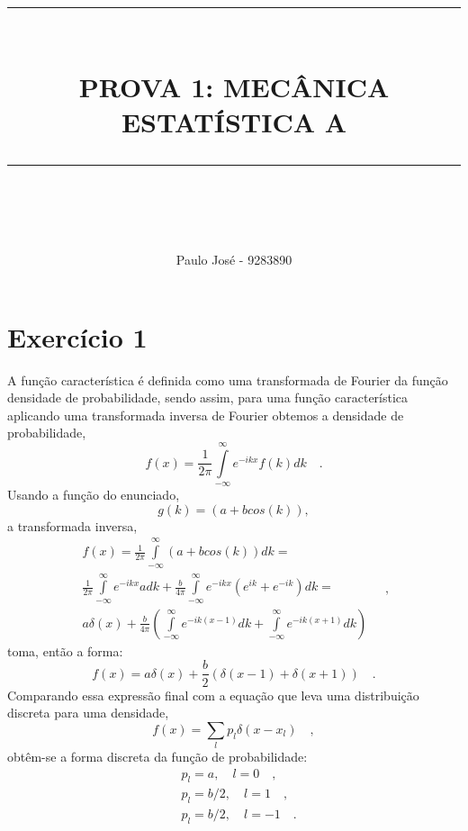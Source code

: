 \documentclass[12pt]{article}
\newcommand{\HRule}[1]{\rule{\linewidth}{#1}}
\begin{document}
\title{ \normalsize \textsc{}
		\\ [2.0cm]
		\HRule{0.5pt} \\
		\LARGE \textbf{\uppercase{Prova 1:  Mecânica Estatística A}}
		\HRule{2pt} \\ [0.5cm]
		\normalsize  \vspace*{5\baselineskip}}



\author{Paulo José - 9283890}
\maketitle
\newpage

\sectionfont{\scshape}
\section*{Exercício 1}
A função característica é definida como uma transformada de Fourier da função densidade de probabilidade, sendo assim, para uma função característica aplicando uma transformada inversa de Fourier obtemos a densidade de probabilidade, 
\begin{equation}
f(x) = \frac{1}{2\pi}\int\limits_{-\infty}^{\infty}e^{-ikx}f(k)dk \quad. 
\end{equation}
Usando a função do enunciado, 
\begin{equation}
g(k) = (a + bcos(k)),
\end{equation}
a transformada inversa,
\begin{equation}
\begin{split}
f(x) = \frac{1}{2\pi}\int\limits_{-\infty}^{\infty}(a + bcos(k))dk = \\
\frac{1}{2\pi}\int\limits_{-\infty}^{\infty}e^{-ikx}a dk + \frac{b}{4\pi}\int\limits_{-\infty}^{\infty} e^{-ikx}\left(e^{ik} + e^{-ik}\right)dk = \\
a\delta(x) + \frac{b}{4\pi}\left( \int\limits_{-\infty}^{\infty}e^{-ik(x - 1)}dk + \int\limits_{-\infty}^{\infty}e^{-ik(x + 1)}dk \right)
\end{split}\quad,
\end{equation}
toma, então a forma:
\begin{equation}
f(x) = a\delta(x) + \frac{b}{2}\left(\delta(x-1) + \delta(x+1)\right) \quad.
\end{equation}
Comparando essa expressão final com a equação que leva uma distribuição discreta para uma densidade,
\begin{equation}
f(x) = \sum_l p_l\delta(x - x_l) \quad ,
\end{equation}
obtêm-se a forma discreta da função de probabilidade:
\begin{equation}
\begin{split}
&p_l = a,\quad l = 0 \quad,\\
&p_l = b/2,\quad l = 1 \quad,\\
&p_l = b/2,\quad l = -1 \quad. 
\end{split}
\end{equation}
\end{document}
